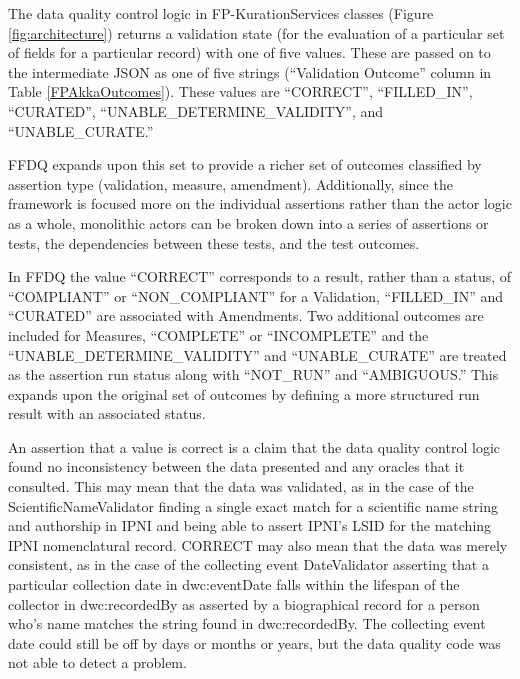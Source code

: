 \documentclass{article}
\begin{document}
The data quality control logic in FP-KurationServices classes (Figure \ref{fig:architecture}) returns a validation state (for the evaluation of a particular set of fields for a particular record) with one of five values.  These are passed on to the intermediate JSON as one of five strings (``Validation Outcome'' column in Table \ref{FPAkkaOutcomes}).  These values are “CORRECT”, “FILLED\_IN”, “CURATED”, “UNABLE\_DETERMINE\_VALIDITY”, and “UNABLE\_CURATE.”

FFDQ expands upon this set to provide a richer set of outcomes classified by assertion type (validation, measure, amendment). Additionally, since the framework is focused more on the individual assertions rather than the actor logic as a whole, monolithic actors can be broken down into a series of assertions or tests, the dependencies between these tests, and the test outcomes.

In FFDQ the value ``CORRECT'' corresponds to a result, rather than a status, of ``COMPLIANT'' or ``NON\_COMPLIANT'' for a Validation, ``FILLED\_IN'' and ``CURATED'' are associated with Amendments. Two additional outcomes are included for Measures, ``COMPLETE'' or ``INCOMPLETE'' and the ``UNABLE\_DETERMINE\_VALIDITY'' and ``UNABLE\_CURATE'' are treated as the assertion run status along with ``NOT\_RUN'' and ``AMBIGUOUS.'' This expands upon the original set of outcomes by defining a more structured run result with an associated status.


An assertion that a value is correct is a claim that the data quality control logic found no inconsistency between the data presented and any oracles that it consulted.  
This may mean that the data was validated, as in the case of the ScientificNameValidator finding a single exact match for a scientific name string and authorship in IPNI and being able to assert IPNI's LSID for the matching IPNI nomenclatural record.
CORRECT may also mean that the data was merely consistent, as in the case of the collecting event DateValidator asserting that a particular collection date in dwc:eventDate falls within the lifespan of the collector in dwc:recordedBy as asserted by a biographical record for a person who's name matches the string found in dwc:recordedBy.  The collecting event date could still be off by days or months or years, but the data quality code was not able to detect a problem.
\end{document}
